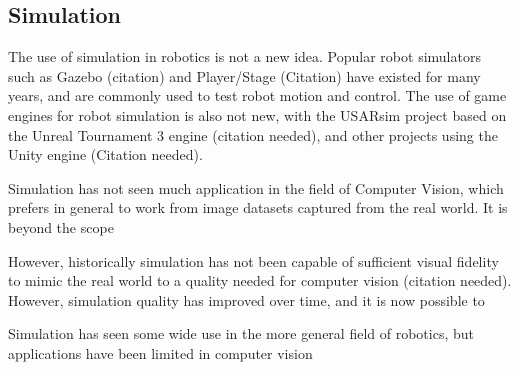 
\subsection{Simulation}

The use of simulation in robotics is not a new idea.
Popular robot simulators such as Gazebo (citation) and Player/Stage (Citation) have existed for many years, and are commonly used to test robot motion and control. The use of game engines for robot simulation is also not new, with the USARsim project based on the Unreal Tournament 3 engine (citation needed), and other projects using the Unity engine (Citation needed).

Simulation has not seen  much application in the field of Computer Vision, which prefers in general to work from image datasets captured from the real world. It is beyond the scope 

However, historically simulation has not been capable of sufficient visual fidelity to mimic the real world to a quality needed for computer vision (citation needed). However, simulation quality has improved over time, and it is now possible to 

Simulation has seen some wide use in the more general field of robotics, but applications have been limited in computer vision

